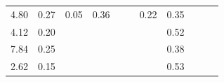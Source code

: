 \begin{refsection}[referencesCh3]
\begin{table}
\begin{adjustbox}{scale=0.65,center}
\begin{tabular}{@{}ccccccccccc@{}}
		4.80                                                         & 0.27                                                & 0.05                                                & 0.36                                                &                                                     &                                                      & 0.22                                                & 0.35                                                  &                                                         &                                                      & \cite{Seppala}                                  \\
		4.12                                                         & 0.20                                                &                                                     &                                                     &                                                     &                                                      &                                                     & 0.52                                                  &                                                         &                                                      & \cite{Alburquerque}                   \\
		7.84                                                         & 0.25                                                &                                                     &                                                     &                                                     &                                                      &                                                     & 0.38                                                  &                                                         &                                                      & \cite{Alburquerque}                             \\
		2.62                                                         & 0.15                                                &                                                     &                                                     &                                                     &                                                      &                                                     & 0.53                                                  &                                                         &                                                      & \cite{Alburquerque}                             \\

\end{tabular}
\end{adjustbox}
\end{table}
\end{refsection}
